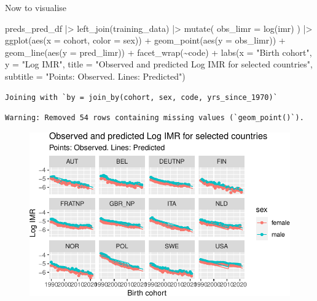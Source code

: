 \documentclass[
  letterpaper,
  DIV=11,
  numbers=noendperiod]{scrartcl}
\newenvironment{Shaded}{\begin{snugshade}}{\end{snugshade}}
\newcommand{\AttributeTok}[1]{\textcolor[rgb]{0.40,0.45,0.13}{#1}}
\newcommand{\FunctionTok}[1]{\textcolor[rgb]{0.28,0.35,0.67}{#1}}
\newcommand{\NormalTok}[1]{\textcolor[rgb]{0.00,0.23,0.31}{#1}}
\newcommand{\SpecialCharTok}[1]{\textcolor[rgb]{0.37,0.37,0.37}{#1}}
\newcommand{\StringTok}[1]{\textcolor[rgb]{0.13,0.47,0.30}{#1}}
\begin{document}
Now to visualise

\begin{Shaded}
\begin{Highlighting}[]
\NormalTok{preds\_pred\_df }\SpecialCharTok{|\textgreater{}} 
  \FunctionTok{left\_join}\NormalTok{(training\_data) }\SpecialCharTok{|\textgreater{}} 
  \FunctionTok{mutate}\NormalTok{(}
    \AttributeTok{obs\_limr =} \FunctionTok{log}\NormalTok{(imr)}
\NormalTok{  ) }\SpecialCharTok{|\textgreater{}} 
  \FunctionTok{ggplot}\NormalTok{(}\FunctionTok{aes}\NormalTok{(}\AttributeTok{x =}\NormalTok{ cohort, }\AttributeTok{color =}\NormalTok{ sex)) }\SpecialCharTok{+} 
  \FunctionTok{geom\_point}\NormalTok{(}\FunctionTok{aes}\NormalTok{(}\AttributeTok{y =}\NormalTok{ obs\_limr)) }\SpecialCharTok{+} 
  \FunctionTok{geom\_line}\NormalTok{(}\FunctionTok{aes}\NormalTok{(}\AttributeTok{y =}\NormalTok{ pred\_limr)) }\SpecialCharTok{+} 
  \FunctionTok{facet\_wrap}\NormalTok{(}\SpecialCharTok{\textasciitilde{}}\NormalTok{code) }\SpecialCharTok{+} 
  \FunctionTok{labs}\NormalTok{(}\AttributeTok{x =} \StringTok{"Birth cohort"}\NormalTok{, }
       \AttributeTok{y =} \StringTok{"Log IMR"}\NormalTok{,}
       \AttributeTok{title =} \StringTok{"Observed and predicted Log IMR for selected countries"}\NormalTok{,}
       \AttributeTok{subtitle =} \StringTok{"Points: Observed. Lines: Predicted"}\NormalTok{)}
\end{Highlighting}
\end{Shaded}

\begin{verbatim}
Joining with `by = join_by(cohort, sex, code, yrs_since_1970)`
\end{verbatim}

\begin{verbatim}
Warning: Removed 54 rows containing missing values (`geom_point()`).
\end{verbatim}

\begin{figure}[H]

{\centering \includegraphics{main_notebook_files/figure-pdf/unnamed-chunk-14-1.pdf}

}

\end{figure}
\end{document}
